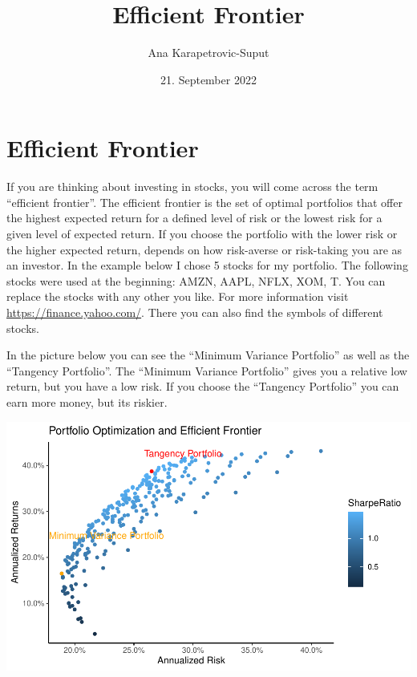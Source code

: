 \documentclass[
]{article}
\title{Efficient Frontier}
\author{Ana Karapetrovic-Suput}
\date{21. September 2022}
\begin{document}
\maketitle

\newpage 
\tableofcontents 
\listoftables
\newpage

\hypertarget{efficient-frontier}{%
\section{Efficient Frontier}\label{efficient-frontier}}

If you are thinking about investing in stocks, you will come across the
term ``efficient frontier''. The efficient frontier is the set of
optimal portfolios that offer the highest expected return for a defined
level of risk or the lowest risk for a given level of expected return.
If you choose the portfolio with the lower risk or the higher expected
return, depends on how risk-averse or risk-taking you are as an
investor. In the example below I chose 5 stocks for my portfolio. The
following stocks were used at the beginning: AMZN, AAPL, NFLX, XOM, T.
You can replace the stocks with any other you like. For more information
visit \url{https://finance.yahoo.com/}. There you can also find the
symbols of different stocks.

In the picture below you can see the ``Minimum Variance Portfolio'' as
well as the ``Tangency Portfolio''. The ``Minimum Variance Portfolio''
gives you a relative low return, but you have a low risk. If you choose
the ``Tangency Portfolio'' you can earn more money, but its riskier.

\begin{center}\includegraphics{EfficientFrontier_files/figure-latex/plot efficient frontier-1} \end{center}
\end{document}
